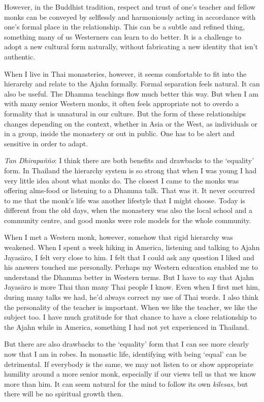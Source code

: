 However, in the Buddhist tradition, 
respect and trust of one's teacher and fellow monks can be conveyed by
selflessly and harmoniously acting in accordance with one's formal place
in the relationship. This can be a subtle and refined thing, something
many of us Westerners can learn to do better. It is a challenge to adopt
a new cultural form naturally, without fabricating a new identity that
isn't authentic.

When I live in Thai monasteries, however, it seems
comfortable to fit into the hierarchy and relate to the Ajahn formally. 
Formal separation feels natural. It can also be useful. The Dhamma
teachings flow much better this way. But when I am with many senior
Western monks, it often feels appropriate not to overdo a formality that
is unnatural in our culture. But the form of these relationships changes
depending on the context, whether in Asia or the West, as individuals or
in a group, inside the monastery or out in public. One has to be alert
and sensitive in order to adapt. 

\emph{Tan Dhīrapañño}: I think there are both benefits and drawbacks to
the `equality' form. In Thailand the hierarchy system is so strong that
when I was young I had very little idea about what monks do. The closest
I came to the monks was offering alms-food or listening to a Dhamma
talk. That was it. It never occurred to me that the monk's life was
another lifestyle that I might choose. Today is different from the old
days, when the monastery was also the local school and a community
centre, and good monks were role models for the whole community. 

When I met a Western monk, however, somehow that rigid hierarchy was
weakened. When I spent a week hiking in America, listening and talking
to Ajahn Jayasāro, I felt very close to him. I felt that I could ask any
question I liked and his answers touched me personally. Perhaps my
Western education enabled me to understand the Dhamma better in Western
terms. But I have to say that Ajahn Jayasāro is more Thai than many Thai
people I know. Even when I first met him, during many talks we had, he'd
always correct my use of Thai words. I also think the personality of the
teacher is important. When we like the teacher, we like the subject too. 
I have much gratitude for that chance to have a close relationship to
the Ajahn while in America, something I had not yet experienced in
Thailand. 

But there are also drawbacks to the `equality' form that I can see more
clearly now that I am in robes. In monastic life, identifying with being
`equal' can be detrimental. If everybody is the same, we may not listen
to or show appropriate humility around a more senior monk, especially if
our views tell us that we know more than him. It can seem natural for
the mind to follow its own \emph{kilesas}, but there will be no
spiritual growth then.

